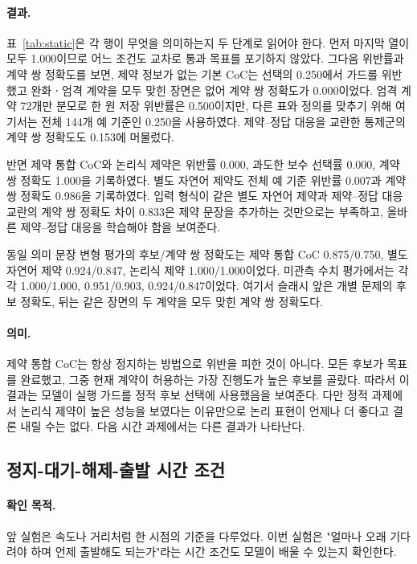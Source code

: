 \paragraph{결과.}
표~\ref{tab:static}은 각 행이 무엇을 의미하는지 두 단계로 읽어야 한다. 먼저 마지막 열이 모두 1.000이므로 어느 조건도 교차로 통과 목표를 포기하지 않았다. 그다음 위반률과 계약 쌍 정확도를 보면, 제약 정보가 없는 기본 CoC는 선택의 0.250에서 가드를 위반했고 완화ㆍ엄격 계약을 모두 맞힌 장면은 없어 계약 쌍 정확도가 0.000이었다. 엄격 계약 72개만 분모로 한 원 저장 위반률은 0.500이지만, 다른 표와 정의를 맞추기 위해 여기서는 전체 144개 예 기준인 0.250을 사용하였다. 제약--정답 대응을 교란한 통제군의 계약 쌍 정확도도 0.153에 머물렀다.

반면 제약 통합 CoC와 논리식 제약은 위반률 0.000, 과도한 보수 선택률 0.000, 계약 쌍 정확도 1.000을 기록하였다. 별도 자연어 제약도 전체 예 기준 위반률 0.007과 계약 쌍 정확도 0.986을 기록하였다. 입력 형식이 같은 별도 자연어 제약과 제약--정답 대응 교란의 계약 쌍 정확도 차이 0.833은 제약 문장을 추가하는 것만으로는 부족하고, 올바른 제약--정답 대응을 학습해야 함을 보여준다.

동일 의미 문장 변형 평가의 후보/계약 쌍 정확도는 제약 통합 CoC 0.875/0.750, 별도 자연어 제약 0.924/0.847, 논리식 제약 1.000/1.000이었다. 미관측 수치 평가에서는 각각 1.000/1.000, 0.951/0.903, 0.924/0.847이었다. 여기서 슬래시 앞은 개별 문제의 후보 정확도, 뒤는 같은 장면의 두 계약을 모두 맞힌 계약 쌍 정확도다.

\paragraph{의미.}
제약 통합 CoC는 항상 정지하는 방법으로 위반을 피한 것이 아니다. 모든 후보가 목표를 완료했고, 그중 현재 계약이 허용하는 가장 진행도가 높은 후보를 골랐다. 따라서 이 결과는 모델이 실행 가드를 정적 후보 선택에 사용했음을 보여준다. 다만 정적 과제에서 논리식 제약이 높은 성능을 보였다는 이유만으로 논리 표현이 언제나 더 좋다고 결론 내릴 수는 없다. 다음 시간 과제에서는 다른 결과가 나타난다.

\subsection{정지-대기-해제-출발 시간 조건}

\paragraph{확인 목적.}
앞 실험은 속도나 거리처럼 한 시점의 기준을 다루었다. 이번 실험은 "얼마나 오래 기다려야 하며 언제 출발해도 되는가"라는 시간 조건도 모델이 배울 수 있는지 확인한다.

